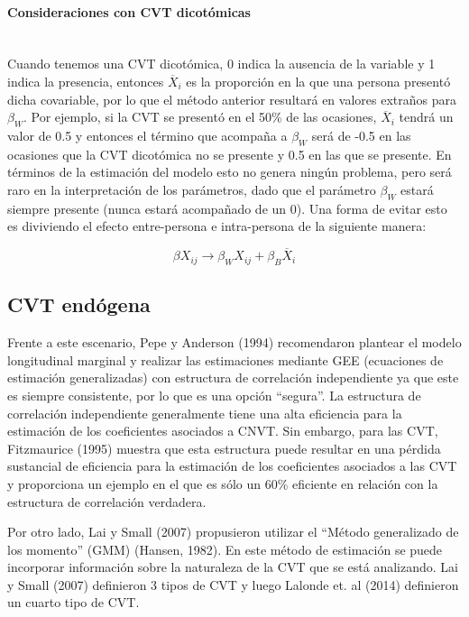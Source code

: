 \documentclass[spanish]{article}
\numberwithin{figure}{subsection}
\numberwithin{equation}{subsection}
\numberwithin{table}{subsection}
\begin{document}
\paragraph{Consideraciones con CVT dicotómicas} \mbox{} \\

Cuando tenemos una CVT dicotómica, 0 indica la ausencia de la variable y 1
indica la presencia, entonces $\overline{X}_i$ es la proporción en la que una
persona presentó dicha covariable, por lo que el método anterior resultará en
valores extraños para $\beta_W$. Por ejemplo, si la CVT se presentó en el 50\%
de las ocasiones, $\overline{X}_i$ tendrá un valor de 0.5 y entonces el término
que acompaña a $\beta_W$ será de -0.5 en las ocasiones que la CVT dicotómica no
se presente y 0.5 en las que se presente. En términos de la estimación del
modelo esto no genera ningún problema, pero será raro en la interpretación de
los parámetros, dado que el parámetro $\beta_W$ estará siempre presente (nunca
estará acompañado de un 0). Una forma de evitar esto es diviviendo el efecto
entre-persona e intra-persona de la siguiente manera:

\[
	\beta X_{ij} \rightarrow \beta_W X_{ij} + \beta_B \overline{X}_i
\]

\subsection{CVT endógena}

Frente a este escenario, Pepe y Anderson (1994) recomendaron plantear el modelo
longitudinal marginal y realizar las estimaciones mediante GEE (ecuaciones de
estimación generalizadas) con estructura de correlación independiente ya que
este es siempre consistente, por lo que es una opción ``segura''. La estructura
de correlación independiente generalmente tiene una alta eficiencia para la
estimación de los coeficientes asociados a CNVT. Sin embargo, para las CVT,
Fitzmaurice (1995) muestra que esta estructura puede resultar en una pérdida
sustancial de eficiencia para la estimación de los coeficientes asociados a las
CVT y proporciona un ejemplo en el que es sólo un 60\% eficiente en relación con
la estructura de correlación verdadera.

Por otro lado, Lai y Small (2007) propusieron utilizar el ``Método generalizado
de los momento'' (GMM) (Hansen, 1982). En este método de estimación se puede
incorporar información sobre la naturaleza de la CVT que se está analizando. Lai
y Small (2007) definieron 3 tipos de CVT y luego Lalonde et. al (2014)
definieron un cuarto tipo de CVT.
\end{document}
